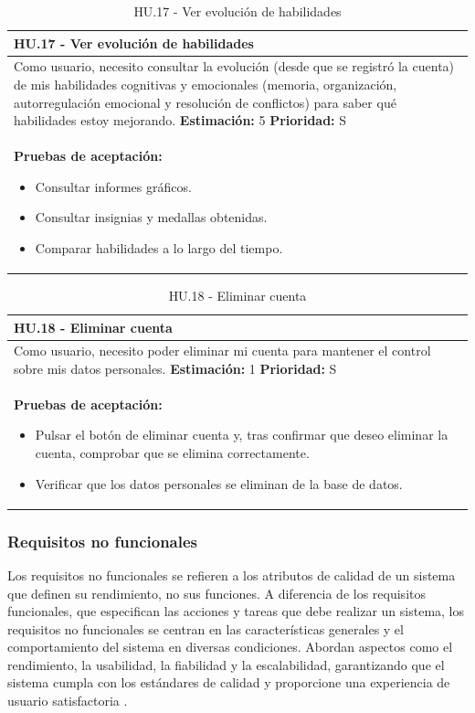 \begin{table}[H]
\centering
\begin{tabularx}{\textwidth}{|X|}
\hline
\textbf{HU.17 - Ver evolución de habilidades}  \\
\hline
Como usuario, necesito consultar la evolución (desde que se registró la cuenta) de mis habilidades cognitivas y emocionales (memoria, organización, autorregulación emocional y resolución de conflictos) para saber qué habilidades estoy mejorando.
\clearpage
\textbf{Estimación: }5
\clearpage
\textbf{Prioridad: }S
\\
\hline
\textbf{Pruebas de aceptación:}
\begin{itemize}
    \item Consultar informes gráficos.
    \item Consultar insignias y medallas obtenidas.
    \item Comparar habilidades a lo largo del tiempo.
\end{itemize}
\\
\hline
\end{tabularx}
\caption{HU.17 - Ver evolución de habilidades}
\end{table}

\begin{table}[H]
\centering
\begin{tabularx}{\textwidth}{|X|}
\hline
\textbf{HU.18 - Eliminar cuenta}  \\
\hline
Como usuario, necesito poder eliminar mi cuenta para mantener el control sobre mis datos personales.
\clearpage
\textbf{Estimación: }1
\clearpage
\textbf{Prioridad: }S
\\
\hline
\textbf{Pruebas de aceptación:}
\begin{itemize}
    \item Pulsar el botón de eliminar cuenta y, tras confirmar que deseo eliminar la cuenta, comprobar que se elimina correctamente.
    \item Verificar que los datos personales se eliminan de la base de datos.
\end{itemize}
\\
\hline
\end{tabularx}
\caption{HU.18 - Eliminar cuenta}
\end{table}

\subsubsection{Requisitos no funcionales}
Los requisitos no funcionales se refieren a los atributos de calidad de un sistema que definen su rendimiento, no sus funciones. 
A diferencia de los requisitos funcionales, que especifican las acciones y tareas que debe realizar un sistema, los requisitos no funcionales se centran en las características generales y el comportamiento del sistema en diversas condiciones. 
Abordan aspectos como el rendimiento, la usabilidad, la fiabilidad y la escalabilidad, garantizando que el sistema cumpla con los estándares de calidad y proporcione una experiencia de usuario satisfactoria \parencite{requisitos}.

